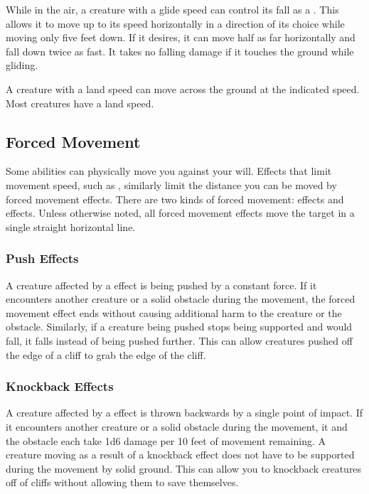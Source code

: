         While in the air, a creature with a glide speed can control its fall as a . This allows it to move up to its speed horizontally in a direction of its choice while moving only five feet down. If it desires, it can move half as far horizontally and fall down twice as fast. It takes no falling damage if it touches the ground while gliding.

        A creature with a land speed can move across the ground at the indicated speed.
        Most creatures have a land speed.

    \subsection{Forced Movement}\label{Forced Movement}
        Some abilities can physically move you against your will.
        Effects that limit movement speed, such as , similarly limit the distance you can be moved by forced movement effects.
        There are two kinds of forced movement:  effects and  effects.
        Unless otherwise noted, all forced movement effects move the target in a single straight horizontal line.

        \subsubsection{Push Effects}\label{Push Effects}
            A creature affected by a  effect is being pushed by a constant force.
            If it encounters another creature or a solid obstacle during the movement, the forced movement effect ends without causing additional harm to the creature or the obstacle.
            Similarly, if a creature being pushed stops being supported and would fall, it falls instead of being pushed further.
            This can allow creatures pushed off the edge of a cliff to grab the edge of the cliff.

        \subsubsection{Knockback Effects}\label{Knockback Effects}
            A creature affected by a  effect is thrown backwards by a single point of impact.
            If it encounters another creature or a solid obstacle during the movement, it and the obstacle each take 1d6 damage per 10 feet of movement remaining.
            A creature moving as a result of a knockback effect does not have to be supported during the movement by solid ground.
            This can allow you to knockback creatures off of cliffs without allowing them to save themselves.

